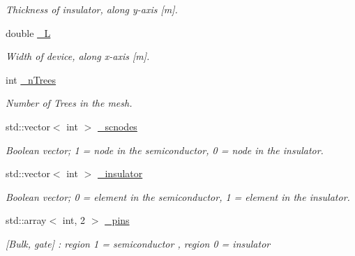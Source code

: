 \begin{DoxyCompactItemize}
\begin{DoxyCompactList}\small\item\em Thickness of insulator, along y-\/axis \mbox{[}m\mbox{]}. \end{DoxyCompactList}\item 
\mbox{\label{class_probl_a5557e696aaf41becde0e346b4389136d}} 
double \mbox{\hyperlink{class_probl_a5557e696aaf41becde0e346b4389136d}{\+\_\+L}}
\begin{DoxyCompactList}\small\item\em Width of device, along x-\/axis \mbox{[}m\mbox{]}. \end{DoxyCompactList}\item 
\mbox{\label{class_probl_a59ad6b6c51ba6229118f0c408902aecd}} 
int \mbox{\hyperlink{class_probl_a59ad6b6c51ba6229118f0c408902aecd}{\+\_\+n\+Trees}}
\begin{DoxyCompactList}\small\item\em Number of Trees in the mesh. \end{DoxyCompactList}\item 
\mbox{\label{class_probl_ab1617f0da567c270428c1822f94f880c}} 
std\+::vector$<$ int $>$ \mbox{\hyperlink{class_probl_ab1617f0da567c270428c1822f94f880c}{\+\_\+scnodes}}
\begin{DoxyCompactList}\small\item\em Boolean vector; 1 = node in the semiconductor, 0 = node in the insulator. \end{DoxyCompactList}\item 
\mbox{\label{class_probl_a7ab8fbd54730f9963467850348056475}} 
std\+::vector$<$ int $>$ \mbox{\hyperlink{class_probl_a7ab8fbd54730f9963467850348056475}{\+\_\+insulator}}
\begin{DoxyCompactList}\small\item\em Boolean vector; 0 = element in the semiconductor, 1 = element in the insulator. \end{DoxyCompactList}\item 
\mbox{\label{class_probl_aacc6e8ee6e40d1a33c11de55dff8ed98}} 
std\+::array$<$ int, 2 $>$ \mbox{\hyperlink{class_probl_aacc6e8ee6e40d1a33c11de55dff8ed98}{\+\_\+pins}}
\begin{DoxyCompactList}\small\item\em \mbox{[}Bulk, gate\mbox{]} \+: region 1 = semiconductor , region 0 = insulator \end{DoxyCompactList}\item 

\end{DoxyCompactItemize}
